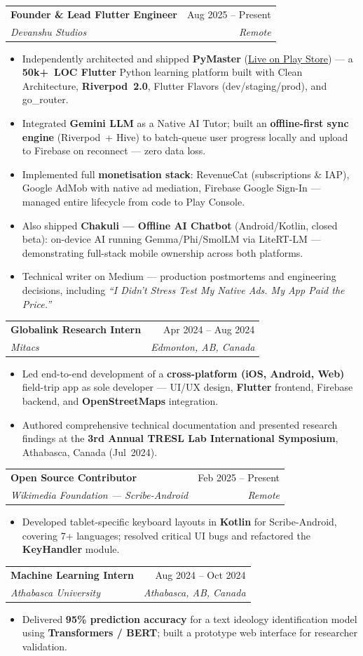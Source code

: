 \documentclass[letterpaper,11pt]{article}
\makeatletter
\newcommand{\resumeItem}[1]{\item\small{#1}}
\newcommand{\resumeSubheading}[4]{
  \vspace{-1pt}\item
    \begin{tabular*}{0.97\textwidth}[t]{l@{\extracolsep{\fill}}r}
      \textbf{#1} & \small #2 \\
      \textit{\small #3} & \textit{\small #4} \\
    \end{tabular*}\vspace{-5pt}
}
\newcommand{\resumeItemListStart}{
  \begin{itemize}[leftmargin=0.20in, itemsep=1pt, parsep=0pt, topsep=2pt]
}
\newcommand{\resumeItemListEnd}{\end{itemize}\vspace{2pt}}
\makeatother
\begin{document}
  \resumeSubheading
    {Founder \& Lead Flutter Engineer}{Aug 2025 -- Present}
    {Devanshu Studios}{Remote}
    \resumeItemListStart
      \resumeItem{Independently architected and shipped \textbf{PyMaster} (\href{https://play.google.com/store/apps/details?id=com.devanshustudios.pymaster}{\underline{Live on Play Store}}) — a \textbf{50k+~LOC Flutter} Python learning platform built with Clean Architecture, \textbf{Riverpod~2.0}, Flutter Flavors (dev/staging/prod), and go\_router.}
      \resumeItem{Integrated \textbf{Gemini LLM} as a Native AI Tutor; built an \textbf{offline-first sync engine} (Riverpod~+ Hive) to batch-queue user progress locally and upload to Firebase on reconnect — zero data loss.}
      \resumeItem{Implemented full \textbf{monetisation stack}: RevenueCat (subscriptions \& IAP), Google AdMob with native ad mediation, Firebase Google Sign-In — managed entire lifecycle from code to Play Console.}
      \resumeItem{Also shipped \textbf{Chakuli — Offline AI Chatbot} (Android/Kotlin, closed beta): on-device AI running Gemma/Phi/SmolLM via LiteRT-LM — demonstrating full-stack mobile ownership across both platforms.}
      \resumeItem{Technical writer on Medium — production postmortems and engineering decisions, including \textit{``I Didn't Stress Test My Native Ads. My App Paid the Price.''}}
    \resumeItemListEnd

  \resumeSubheading
    {Globalink Research Intern}{Apr 2024 -- Aug 2024}
    {Mitacs}{Edmonton, AB, Canada}
    \resumeItemListStart
      \resumeItem{Led end-to-end development of a \textbf{cross-platform (iOS, Android, Web)} field-trip app as sole developer — UI/UX design, \textbf{Flutter} frontend, Firebase backend, and \textbf{OpenStreetMaps} integration.}
      \resumeItem{Authored comprehensive technical documentation and presented research findings at the \textbf{3rd Annual TRESL Lab International Symposium}, Athabasca, Canada (Jul~2024).}
    \resumeItemListEnd

  \resumeSubheading
    {Open Source Contributor}{Feb 2025 -- Present}
    {Wikimedia Foundation — Scribe-Android}{Remote}
    \resumeItemListStart
      \resumeItem{Developed tablet-specific keyboard layouts in \textbf{Kotlin} for Scribe-Android, covering 7+ languages; resolved critical UI bugs and refactored the \textbf{KeyHandler} module.}
    \resumeItemListEnd

  \resumeSubheading
    {Machine Learning Intern}{Aug 2024 -- Oct 2024}
    {Athabasca University}{Athabasca, AB, Canada}
    \resumeItemListStart
      \resumeItem{Delivered \textbf{95\% prediction accuracy} for a text ideology identification model using \textbf{Transformers / BERT}; built a prototype web interface for researcher validation.}
    \resumeItemListEnd
\end{document}
